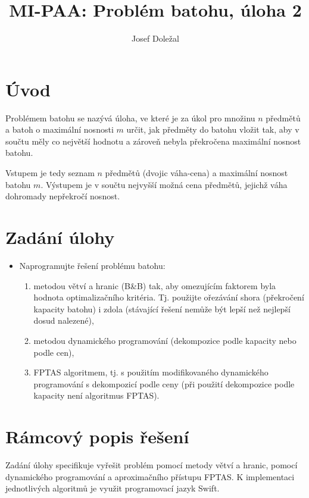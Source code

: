 \documentclass{article}
\title{MI-PAA: Problém batohu, úloha 2}
\author{Josef Doležal}
\begin{document}
\maketitle

\section{Úvod}
Problémem batohu se nazývá úloha, ve které je za úkol pro množinu $n$ předmětů a batoh o maximální nosnosti $m$ určit, jak předměty do batohu vložit tak, aby v součtu měly co největší hodnotu a zároveň nebyla překročena maximální nosnost batohu.

Vstupem je tedy seznam $n$ předmětů (dvojic váha-cena) a maximální nosnost batohu $m$.
Výstupem je v součtu nejvyšší možná cena předmětů, jejichž váha dohromady nepřekročí nosnost.

\section{Zadání úlohy}

\begin{itemize}
    \item Naprogramujte řešení problému batohu:
    
    \begin{enumerate}
        \item metodou větví a hranic (B\&B) tak, aby omezujícím faktorem byla hodnota optimalizačního kritéria. Tj. použijte ořezávání shora (překročení kapacity batohu) i zdola (stávající řešení nemůže být lepší než nejlepší dosud nalezené),
        
        \item metodou dynamického programování (dekompozice podle kapacity nebo podle cen),
        
        \item FPTAS algoritmem, tj. s použitím modifikovaného dynamického programování s dekompozicí podle ceny (při použití dekompozice podle kapacity není algoritmus FPTAS).
    \end{enumerate}
\end{itemize}

\section{Rámcový popis řešení}

Zadání úlohy specifikuje vyřešit problém pomocí metody větví a hranic, pomocí dynamického programování a aproximačního přístupu FPTAS.
K implementaci jednotlivých algoritmů je využit programovací jazyk Swift.
\end{document}

